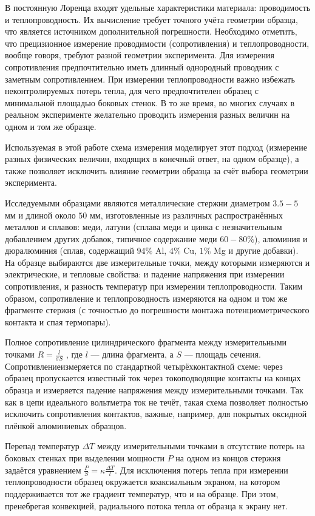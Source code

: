 \documentclass[a4paper,12pt]{article} %
\begin{document}
В постоянную Лоренца входят удельные характеристики материала: проводимость и теплопроводность. Их вычисление требует точного учёта геометрии образца, что является источником дополнительной погрешности. Необходимо отметить, что прецизионное измерение проводимости (сопротивления) и теплопроводности, вообще говоря, требуют разной геометрии эксперимента. Для измерения сопротивления предпочтительно иметь длинный однородный проводник с заметным сопротивлением. При измерении теплопроводности важно избежать неконтролируемых потерь тепла, для чего предпочтителен образец с минимальной площадью боковых стенок. В то же время, во многих случаях в реальном эксперименте желательно проводить измерения разных величин на одном и том же образце.

Используемая в этой работе схема измерения моделирует этот подход (измерение разных физических величин, входящих в конечный ответ, на одном образце), а также позволяет исключить влияние геометрии образца за счёт выбора геометрии эксперимента.

Исследуемыми образцами являются металлические стержни диаметром $3.5-5$ мм и длиной около $50$ мм, изготовленные из различных распространённых металлов и сплавов: меди, латуни (сплава меди и цинка с незначительным добавлением других добавок, типичное содержание меди $60-80\%$), алюминия и дюралюминия (сплав, содержащий $94\% $ Al, $4\%$ Cu, $1\%$ Mg и другие добавки). На образце выбираются две измерительные точки, между которыми измеряются и электрические, и тепловые свойства: и падение напряжения при измерении сопротивления, и разность температур при измерении теплопроводности. Таким образом, сопротивление и теплопроводность измеряются на одном и том же фрагменте стержня (с точностью до погрешности монтажа потенциометрического контакта и спая термопары).

Полное сопротивление цилиндрического фрагмента между измерительными точками $\displaystyle  R=\frac{l}{\sigma S}$ , где $l$ — длина фрагмента, а $S$ — площадь сечения. Сопротивлениеизмеряется по стандартной четырёхконтактной схеме: через образец пропускается известный ток через токоподводящие контакты на концах образца и измеряется падение напряжения между измерительными точками. Так как в цепи идеального вольтметра ток не течёт, такая схема позволяет полностью исключить сопротивления контактов, важные, например, для покрытых оксидной плёнкой алюминиевых образцов.

Перепад температур $\Delta T$ между измерительными точками в отсутствие потерь на боковых стенках при выделении мощности $P$ на одном из концов стержня задаётся уравнением
$\displaystyle  \frac{P}{S}= \kappa \frac{\Delta T}{l}$. Для исключения потерь тепла при измерении теплопроводности образец
окружается коаксиальным экраном, на котором поддерживается тот же градиент температур, что и на образце. При этом, пренебрегая конвекцией, радиального потока тепла от образца к экрану нет.
\end{document}

